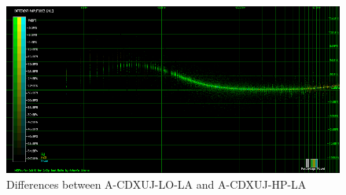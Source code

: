 \documentclass[10pt,a4paper]{report}
\begin{document}
\begin{figure}[H]
	\centering
	\includegraphics[width=1.0\linewidth]{images/results/8-A-CDXUJ-LO_LA_vs_A-CDXUJ-HP_LA.png}
	\caption[A-CDXUJ-LO-LA vs A-CDXUJ-HP-LA]{Differences between A-CDXUJ-LO-LA and A-CDXUJ-HP-LA}
	\label{fig:A-CDXUJ-LO_LA_vs_A-CDXUJ-HP_LA}
\end{figure}
\end{document}

